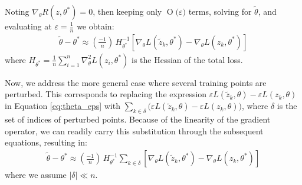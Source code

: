 \documentclass{article}
\newcommand{\BigO}[1]{\ensuremath{\operatorname{O}\bigl(#1\bigr)}}
\begin{document}
Noting $\nabla_{\theta} R(z, \theta^*) = 0$, then keeping only $\BigO{\varepsilon}$ terms, solving for $\tilde{\theta}$, and evaluating at $\varepsilon = \frac{1}{n}$ we obtain:
\begin{align}\label{eq:influence_2}
\tilde{\theta} - \theta^* \approx
\left( \frac{-1}{n} \right) \, H_{\theta^*} ^{-1} \left[ \nabla_{\theta} L(\tilde{z}_k, \theta^*) - \nabla_{\theta} L(z_k, \theta^*)\right]
\end{align}
where $H_{\theta^*} = \frac{1}{n}\sum_{i=1}^n \nabla_{\theta}^2 L(z_i,\theta^*)$ is the Hessian of the total loss.

Now, we address the more general case where several training points are perturbed. 
This corresponds to replacing the expression $\varepsilon L(\tilde{z}_k, \theta) - \varepsilon L(z_k, \theta)$ in Equation \eqref{eq:theta_eps} with $\sum_{k\in\delta} \big( \varepsilon L(\tilde{z}_k, \theta) - \varepsilon L(z_k, \theta) \big)$, where $\delta$ is the set of indices of perturbed points. 
Because of the linearity of the gradient operator, we can readily carry this substitution through the subsequent equations, resulting in:
\begin{align}\label{eq:influence_sum}
\tilde{\theta} - \theta^* \approx
\left( \frac{-1}{n} \right) \, H_{\theta^*} ^{-1} \sum_{k\in\delta}\left[\nabla_{\theta} L(\tilde{z}_k, \theta^*) - \nabla_{\theta} L(z_k, \theta^*)\right]
\end{align}
where we assume $|\delta| \ll n$.
\end{document}
